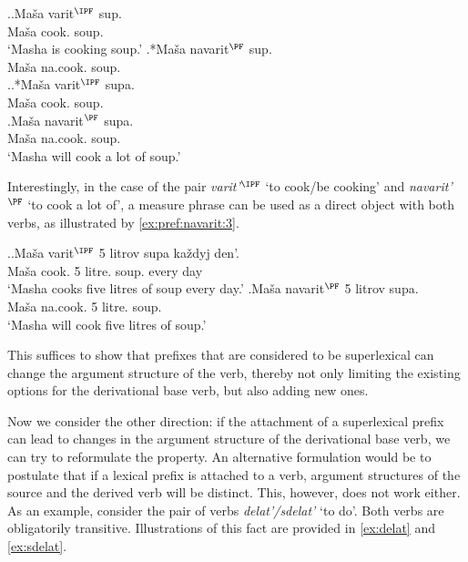 \ex.\label{ex:pref:navarit:1}\ag.\label{ex:varit:1}Ma\v{s}a varit$^{\IPF}$ sup.\\
Ma\v{s}a cook. soup.\\
\trans `Masha is cooking soup.'
\bg.*Ma\v{s}a navarit$^{\PF}$ sup.\label{ex:navarit1}\\
Ma\v{s}a na.cook. soup.\\

\ex.\label{ex:pref:navarit:2}\ag.*Ma\v{s}a varit$^{\IPF}$ supa.\label{ex:varit2}\\
Ma\v{s}a cook. soup.\\
\bg.\label{ex:navarit2}Ma\v{s}a navarit$^{\PF}$ supa.\\
Ma\v{s}a na.cook. soup.\\
\trans `Masha will cook a lot of soup.'

Interestingly, in the case of the pair \textit{varit'}$^{\IPF}$ `to cook/be cooking' and \textit{navarit'}$^{\PF}$ `to cook a lot of', a measure phrase can be used as a direct object with both verbs, as illustrated by \ref{ex:pref:navarit:3}.

\ex.\label{ex:pref:navarit:3}\ag.\label{ex:varit3}Ma\v{s}a varit$^{\IPF}$ 5 litrov supa ka\v{z}dyj den'.\\
Ma\v{s}a cook. 5 litre. soup. every day\\
\trans `Masha cooks five litres of soup every day.'
\bg.\label{ex:navarit3}Ma\v{s}a navarit$^{\PF}$ 5 litrov supa.\\
Ma\v{s}a na.cook. 5 litre. soup.\\
\trans `Masha will cook five litres of soup.'

This suffices to show that prefixes that are considered to be superlexical can change the argument structure of the verb, thereby not only limiting the existing options for the derivational base verb, but also adding new ones.

Now we consider the other direction: if the attachment of a superlexical prefix can lead to changes in the argument structure of the derivational base verb, we can try to reformulate the property. An alternative formulation would be to postulate that if a lexical prefix is attached to a verb, argument structures of the source and the derived verb will be distinct. This, however, does not work either. As an example, consider the pair of verbs \textit{delat'/sdelat'} `to do'. Both verbs are obligatorily transitive. Illustrations of this fact are provided in \ref{ex:delat} and \ref{ex:sdelat}.

